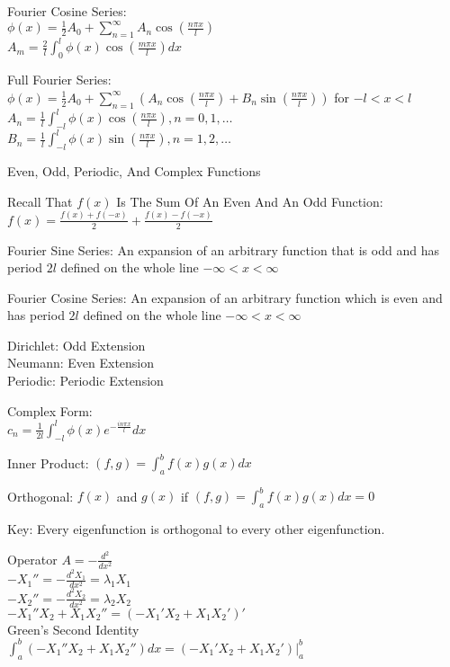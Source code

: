 Fourier Cosine Series: \\
$\phi (x)=\frac{1}{2} A_0 + \sum_{n=1}^{\infty} A_n \cos \left(\frac{n \pi x}{l} \right)$ \\
$A_m = \frac{2}{l} \int_0^l \phi(x) \cos \left(\frac{m \pi x}{l} \right) dx$

Full Fourier Series: \\
$\phi (x)=\frac{1}{2} A_0 + \sum_{n=1}^{\infty} \left(A_n \cos \left(\frac{n \pi x}{l} \right) + B_n \sin \left(\frac{n \pi x}{l} \right) \right) $ for $ -l<x<l$ \\
$A_n=\frac{1}{l}\int_{-l}^l \phi (x)\cos \left(\frac{n \pi x}{l} \right) ,n=0,1,\dots$ \\
$B_n = \frac{1}{l} \int_{-l}^l \phi (x) \sin \left(\frac{n \pi x}{l} \right) ,n=1,2,\dots$

Even, Odd, Periodic, And Complex Functions

Recall That $f(x)$ Is The Sum Of An Even And An Odd Function: \\
$f(x)=\frac{f(x)+f(-x)}{2}+\frac{f(x)-f(-x)}{2}$

Fourier Sine Series: An expansion of an arbitrary function that is odd and has period $2l$ defined on the whole line $-\infty < x < \infty$

Fourier Cosine Series: An expansion of an arbitrary function which is even and has period $2l$ defined on the whole line $-\infty < x <\infty$

Dirichlet: Odd Extension \\
Neumann: Even Extension \\
Periodic: Periodic Extension

Complex Form: \\
$c_n = \frac{1}{2l} \int_{-l}^l \phi (x) e^{-\frac{i n \pi x}{l}} dx$

Inner Product: $(f,g) = \int_a^b f(x)g(x)dx$

Orthogonal: $f(x)$ and $g(x)$ if $(f,g) = \int_a^b f(x)g(x)dx = 0$

Key: Every eigenfunction is orthogonal to every other eigenfunction.

Operator $A = -\frac{d^2}{dx^2}$ \\
$-X_1'' = -\frac{d^2 X_1}{dx^2} = \lambda_1 X_1$ \\
$-X_2'' = -\frac{d^2X_2}{dx^2} = \lambda_2 X_2$ \\
$-X_1''X_2 + X_1 X_2'' = (-X_1'X_2 + X_1 X_2')'$ \\
Green's Second Identity \\
$\int_a^b (-X_1''X_2 + X_1X_2'') dx = (-X_1'X_2+X_1X_2') |_a^b$

